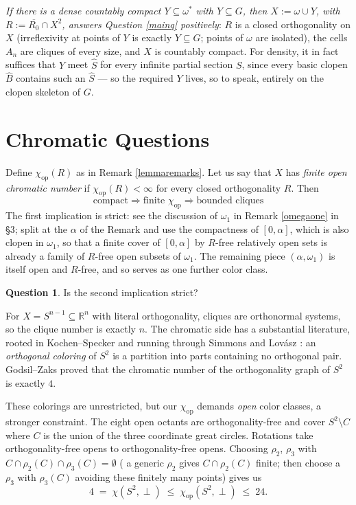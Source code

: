 \documentclass[12pt]{article}
\newcommand{\R}{{\mathbb R}}
\newcommand{\chiop}{\chi_{\mathrm{op}}}
\theoremstyle{plain}
\theoremstyle{definition}
\newtheorem{question}{Question}
\theoremstyle{remark}
\begin{document}
{\em If there is a dense countably compact $Y \subseteq \omega^*$ with $Y \subseteq G$, then $X := \omega \cup Y$, with $R := \overline{R_0} \cap X^2$, answers Question \ref{mainq} positively}: $R$ is a closed orthogonality on $X$ (irreflexivity at points of $Y$ is exactly $Y \subseteq G$; points of $\omega$ are isolated), the cells $A_n$ are cliques of every size, and $X$ is countably compact. For density, it in fact suffices that $Y$ meet $\widehat{S}$ for every infinite partial section $S$, since every basic clopen $\widehat{B}$ contains such an $\widehat{S}$ --- so the required $Y$ lives, so to speak, entirely on the clopen skeleton of $G$.\\






\section{Chromatic Questions} 

Define $\chiop(R)$ as in Remark \ref{lemmaremarks}.  
Let us say that $X$ has {\em finite open chromatic number} if $\chiop(R) < \infty$ for every closed orthogonality $R$. Then
\[ \mbox{compact} \Rightarrow \mbox{finite } \chiop \Rightarrow \mbox{bounded cliques}\]
The first implication is strict: see the 
discussion of $\omega_1$ in Remark \ref{omegaone} in \S3; split at the $\alpha$ of the Remark and use the compactness of $[0,\alpha]$,  which is also clopen in $\omega_1$, so that a finite cover of $[0,\alpha]$ by $R$-free relatively open sets is already a family of $R$-free open subsets of $\omega_1$. The remaining piece $(\alpha,\omega_1)$ is itself open and $R$-free, and so serves as one further color class.

\begin{question} 
Is the second implication strict? 
\end{question}


For $X = S^{n-1} \subseteq \R^n$ with literal orthogonality, cliques are orthonormal systems, so the clique number is exactly $n$. The chromatic side has a substantial literature, rooted in Kochen--Specker \cite{KS} and running through Simmons \cite{Si} and  Lov\'asz \cite{Lo}: an {\em orthogonal coloring} of $S^2$ is a partition into parts containing no orthogonal pair. Godsil--Zaks \cite{GZ} proved that the chromatic number of the orthogonality graph of $S^2$ is exactly $4$. 

These colorings are unrestricted, but our $\chiop$ demands {\em open} color classes, a stronger constraint. The eight open octants are orthogonality-free and cover 
$S^2 \setminus C$ where 
$C$ is the union of the three coordinate great circles. 
Rotations take orthogonality-free opens to orthogonality-free opens. Choosing  $\rho_2$, $\rho_3$ with $C \cap \rho_2(C) \cap \rho_3(C) = \emptyset$ (
a generic $\rho_2$ gives $C \cap \rho_2(C)$ finite; then choose a $\rho_3$ with $\rho_{3}(C)$ avoiding these finitely many points) gives us 
\[ 4 \; = \; \chi(S^2, \perp) \; \leq \; \chiop(S^2, \perp) \; \leq \; 24.\]
\end{document}
